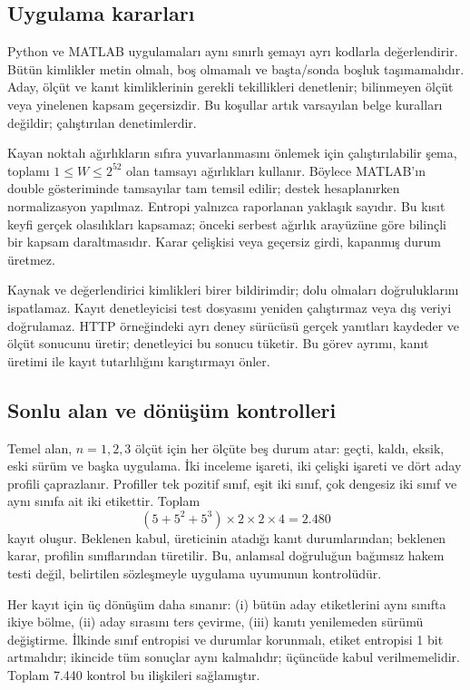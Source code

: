 \documentclass[runningheads]{llncs}
\begin{document}
\subsection{Uygulama kararları}
Python ve MATLAB uygulamaları aynı sınırlı şemayı ayrı kodlarla değerlendirir. Bütün kimlikler metin olmalı, boş olmamalı ve başta/sonda boşluk taşımamalıdır. Aday, ölçüt ve kanıt kimliklerinin gerekli tekillikleri denetlenir; bilinmeyen ölçüt veya yinelenen kapsam geçersizdir. Bu koşullar artık varsayılan belge kuralları değildir; çalıştırılan denetimlerdir.

Kayan noktalı ağırlıkların sıfıra yuvarlanmasını önlemek için çalıştırılabilir şema, toplamı $1\leq W\leq2^{52}$ olan tamsayı ağırlıkları kullanır. Böylece MATLAB'ın double gösteriminde tamsayılar tam temsil edilir; destek hesaplanırken normalizasyon yapılmaz. Entropi yalnızca raporlanan yaklaşık sayıdır. Bu kısıt keyfi gerçek olasılıkları kapsamaz; önceki serbest ağırlık arayüzüne göre bilinçli bir kapsam daraltmasıdır. Karar çelişkisi veya geçersiz girdi, kapanmış durum üretmez.

Kaynak ve değerlendirici kimlikleri birer bildirimdir; dolu olmaları doğruluklarını ispatlamaz. Kayıt denetleyicisi test dosyasını yeniden çalıştırmaz veya dış veriyi doğrulamaz. HTTP örneğindeki ayrı deney sürücüsü gerçek yanıtları kaydeder ve ölçüt sonucunu üretir; denetleyici bu sonucu tüketir. Bu görev ayrımı, kanıt üretimi ile kayıt tutarlılığını karıştırmayı önler.

\subsection{Sonlu alan ve dönüşüm kontrolleri}
Temel alan, $n=1,2,3$ ölçüt için her ölçüte beş durum atar: geçti, kaldı, eksik, eski sürüm ve başka uygulama. İki inceleme işareti, iki çelişki işareti ve dört aday profili çaprazlanır. Profiller tek pozitif sınıf, eşit iki sınıf, çok dengesiz iki sınıf ve aynı sınıfa ait iki etikettir. Toplam
\begin{equation}
(5+5^2+5^3)\times2\times2\times4=2.480
\end{equation}
kayıt oluşur. Beklenen kabul, üreticinin atadığı kanıt durumlarından; beklenen karar, profilin sınıflarından türetilir. Bu, anlamsal doğruluğun bağımsız hakem testi değil, belirtilen sözleşmeyle uygulama uyumunun kontrolüdür.

Her kayıt için üç dönüşüm daha sınanır: (i) bütün aday etiketlerini aynı sınıfta ikiye bölme, (ii) aday sırasını ters çevirme, (iii) kanıtı yenilemeden sürümü değiştirme. İlkinde sınıf entropisi ve durumlar korunmalı, etiket entropisi 1 bit artmalıdır; ikincide tüm sonuçlar aynı kalmalıdır; üçüncüde kabul verilmemelidir. Toplam 7.440 kontrol bu ilişkileri sağlamıştır.
\end{document}
